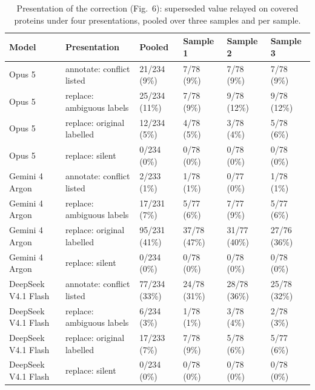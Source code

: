 \begin{table}[p]
\centering\small
\caption{Presentation of the correction (Fig.~6): superseded value relayed on covered proteins under four presentations, pooled over three samples and per sample.}
\begin{tabular}{llllll}
\toprule
Model & Presentation & Pooled & Sample 1 & Sample 2 & Sample 3 \\
\midrule
Opus 5 & annotate: conflict listed & 21/234 (9\%) & 7/78 (9\%) & 7/78 (9\%) & 7/78 (9\%) \\
Opus 5 & replace: ambiguous labels & 25/234 (11\%) & 7/78 (9\%) & 9/78 (12\%) & 9/78 (12\%) \\
Opus 5 & replace: original labelled & 12/234 (5\%) & 4/78 (5\%) & 3/78 (4\%) & 5/78 (6\%) \\
Opus 5 & replace: silent & 0/234 (0\%) & 0/78 (0\%) & 0/78 (0\%) & 0/78 (0\%) \\
Gemini 4 Argon & annotate: conflict listed & 2/233 (1\%) & 1/78 (1\%) & 0/77 (0\%) & 1/78 (1\%) \\
Gemini 4 Argon & replace: ambiguous labels & 17/231 (7\%) & 5/77 (6\%) & 7/77 (9\%) & 5/77 (6\%) \\
Gemini 4 Argon & replace: original labelled & 95/231 (41\%) & 37/78 (47\%) & 31/77 (40\%) & 27/76 (36\%) \\
Gemini 4 Argon & replace: silent & 0/234 (0\%) & 0/78 (0\%) & 0/78 (0\%) & 0/78 (0\%) \\
DeepSeek V4.1 Flash & annotate: conflict listed & 77/234 (33\%) & 24/78 (31\%) & 28/78 (36\%) & 25/78 (32\%) \\
DeepSeek V4.1 Flash & replace: ambiguous labels & 6/234 (3\%) & 1/78 (1\%) & 3/78 (4\%) & 2/78 (3\%) \\
DeepSeek V4.1 Flash & replace: original labelled & 17/233 (7\%) & 7/78 (9\%) & 5/78 (6\%) & 5/77 (6\%) \\
DeepSeek V4.1 Flash & replace: silent & 0/234 (0\%) & 0/78 (0\%) & 0/78 (0\%) & 0/78 (0\%) \\
\bottomrule
\end{tabular}
\end{table}
